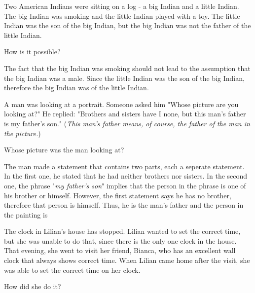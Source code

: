 \documentclass{article}
\begin{document}
\begin{example*}
    \label{example:pi-2022-4-p1}
    Two American Indians were sitting on a log - a big Indian and a little Indian.
    The big Indian was smoking and the little Indian played with a toy.
    The little Indian was the son of the big Indian,
    but the big Indian was not the father of the little Indian.

    How is it possible?
\end{example*}

\begin{soln}
    The fact that the big Indian was smoking should not lead to the assumption that the big Indian was a male.
    Since the little Indian was the son of the big Indian,
    therefore the big Indian was  of the little Indian.
\end{soln}

\begin{example*}
    \label{example:pi-2022-4-p2}
    A man was looking at a portrait. Someone asked him "Whose picture are you looking at?"
    He replied: "Brothers and sisters have I none, but this man's father is my father's son."
    (\textit{This man's father means, of course, the father of the man in the picture.})

    Whose picture was the man looking at?
\end{example*}

\begin{soln}
    The man made a statement that contains two parts, each a seperate statement.
    In the first one, he stated that he had neither brothers nor sisters.
    In the second one, the phrase "\textit{my father's son}" implies that the person in the phrase
    is one of his brother or himself.
    However, the first statement says he has no brother, therefore that person is himself.
    Thus, he is the man's father and the person in the painting is 
\end{soln}

\begin{example*}
    \label{example:pi-2022-4-p3}
    The clock in Lilian's house has stopped. Lilian wanted to set the correct time,
    but she was unable to do that, since there is the only one clock in the house.
    That evening, she went to visit her friend, Bianca,
    who has an excellent wall clock that always shows correct time.
    When Lilian came home after the visit, she was able to set the correct time on her clock.

    How did she do it?
\end{example*}
\end{document}
